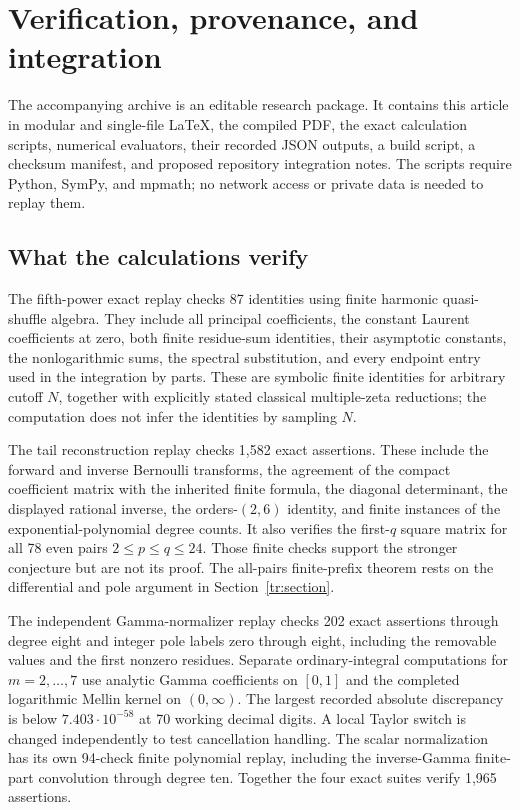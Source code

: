 \section{Verification, provenance, and integration}
\label{sec:reproducibility}

The accompanying archive is an editable research package. It contains
this article in modular and single-file \LaTeX, the compiled PDF,
the exact calculation scripts, numerical evaluators, their recorded
JSON outputs, a build script, a checksum manifest, and proposed
repository integration notes. The scripts require Python, SymPy, and
mpmath; no network access or private data is needed to replay them.

\subsection{What the calculations verify}

The fifth-power exact replay checks 87 identities using finite harmonic
quasi-shuffle algebra. They include all principal coefficients, the
constant Laurent coefficients at zero, both finite residue-sum
identities, their asymptotic constants, the nonlogarithmic sums,
the spectral substitution, and every endpoint entry used in the
integration by parts. These are symbolic finite identities for
arbitrary cutoff $N$, together with explicitly stated classical
multiple-zeta reductions; the computation does not infer the
identities by sampling $N$.

The tail reconstruction replay checks 1,582 exact assertions. These
include the forward and inverse Bernoulli transforms, the agreement
of the compact coefficient matrix with the inherited finite formula,
the diagonal determinant, the displayed rational inverse, the
orders-$(2,6)$ identity, and finite instances of the
exponential-polynomial degree counts. It also verifies the first-$q$
square matrix for all 78 even pairs $2\le p\le q\le24$. Those
finite checks support the stronger conjecture but are not its proof.
The all-pairs finite-prefix theorem rests on the differential and
pole argument in Section~\ref{tr:section}.

The independent Gamma-normalizer replay checks 202 exact assertions
through degree eight and integer pole labels zero through eight,
including the removable values and the first nonzero residues.
Separate ordinary-integral computations for $m=2,\ldots,7$ use
analytic Gamma coefficients on $[0,1]$ and the completed logarithmic
Mellin kernel on $(0,\infty)$. The largest recorded absolute
discrepancy is below $7.403\cdot10^{-58}$ at 70 working decimal
digits. A local Taylor switch is changed independently to test
cancellation handling. The scalar normalization has its own 94-check finite polynomial
replay, including the inverse-Gamma finite-part convolution through
degree ten. Together the four exact suites verify 1,965 assertions.

